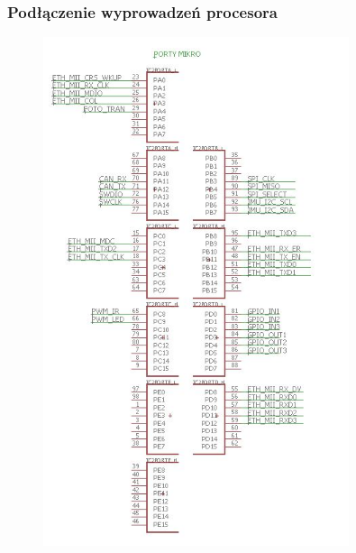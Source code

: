 \documentclass[12pt]{article}
\begin{document}
\subsubsection{Podłączenie wyprowadzeń procesora}
\begin{figure}[H]
\begin{center}
\includegraphics[width=0.8\textwidth]{figures/schemat9.jpg}
\end{center}
\end{figure}
\end{document}
